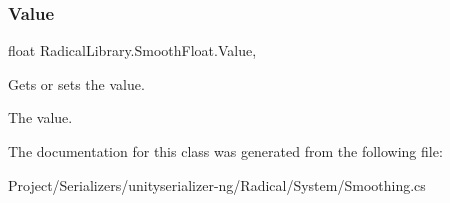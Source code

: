 \subsubsection{\texorpdfstring{Value}{Value}}
{\footnotesize\ttfamily float Radical\+Library.\+Smooth\+Float.\+Value\hspace{0.3cm}{\ttfamily [get]}, {\ttfamily [set]}}



Gets or sets the value. 

The value.

The documentation for this class was generated from the following file\+:\begin{DoxyCompactItemize}
\item 
Project/\+Serializers/unityserializer-\/ng/\+Radical/\+System/Smoothing.\+cs\end{DoxyCompactItemize}

